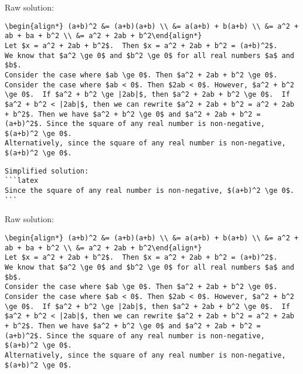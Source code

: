 \documentclass{article}
\begin{document}
Raw solution:
\begin{verbatim}
\begin{align*} (a+b)^2 &= (a+b)(a+b) \\ &= a(a+b) + b(a+b) \\ &= a^2 + ab + ba + b^2 \\ &= a^2 + 2ab + b^2\end{align*} 
Let $x = a^2 + 2ab + b^2$.  Then $x = a^2 + 2ab + b^2 = (a+b)^2$.
We know that $a^2 \ge 0$ and $b^2 \ge 0$ for all real numbers $a$ and $b$.
Consider the case where $ab \ge 0$. Then $a^2 + 2ab + b^2 \ge 0$.
Consider the case where $ab < 0$. Then $2ab < 0$. However, $a^2 + b^2 \ge 0$.  If $a^2 + b^2 \ge |2ab|$, then $a^2 + 2ab + b^2 \ge 0$.  If $a^2 + b^2 < |2ab|$, then we can rewrite $a^2 + 2ab + b^2 = a^2 + 2ab + b^2$. Then we have $a^2 + b^2 \ge 0$ and $a^2 + 2ab + b^2 = (a+b)^2$. Since the square of any real number is non-negative, $(a+b)^2 \ge 0$.
Alternatively, since the square of any real number is non-negative, $(a+b)^2 \ge 0$.

\end{verbatim}

\begin{verbatim}
Simplified solution:
```latex
Since the square of any real number is non-negative, $(a+b)^2 \ge 0$.
```

\end{verbatim}



Raw solution:
\begin{verbatim}
\begin{align*} (a+b)^2 &= (a+b)(a+b) \\ &= a(a+b) + b(a+b) \\ &= a^2 + ab + ba + b^2 \\ &= a^2 + 2ab + b^2\end{align*} 
Let $x = a^2 + 2ab + b^2$.  Then $x = a^2 + 2ab + b^2 = (a+b)^2$.
We know that $a^2 \ge 0$ and $b^2 \ge 0$ for all real numbers $a$ and $b$.
Consider the case where $ab \ge 0$. Then $a^2 + 2ab + b^2 \ge 0$.
Consider the case where $ab < 0$. Then $2ab < 0$. However, $a^2 + b^2 \ge 0$.  If $a^2 + b^2 \ge |2ab|$, then $a^2 + 2ab + b^2 \ge 0$.  If $a^2 + b^2 < |2ab|$, then we can rewrite $a^2 + 2ab + b^2 = a^2 + 2ab + b^2$. Then we have $a^2 + b^2 \ge 0$ and $a^2 + 2ab + b^2 = (a+b)^2$. Since the square of any real number is non-negative, $(a+b)^2 \ge 0$.
Alternatively, since the square of any real number is non-negative, $(a+b)^2 \ge 0$.

\end{verbatim}
\end{document}
